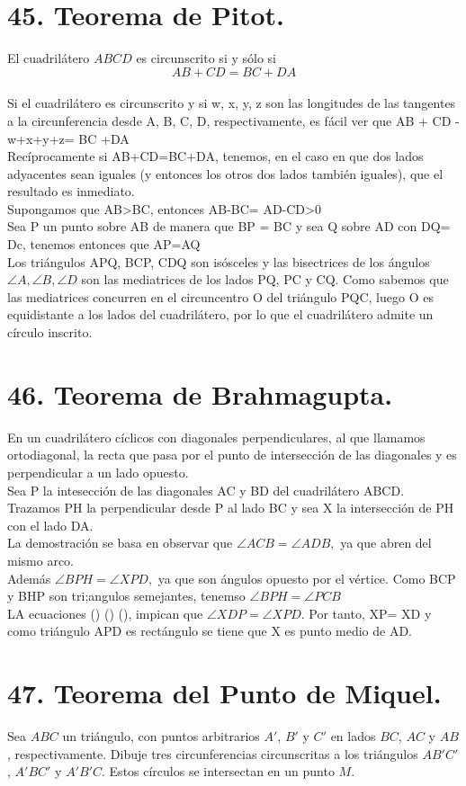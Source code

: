 \documentclass[12pt,a4paper, oneside]{book}
\begin{document}
\section{45. Teorema de Pitot.}
El cuadrilátero $ABCD$ es circunscrito si y sólo si $$AB + CD = BC +DA$$
\\
Si el cuadrilátero es circunscrito y si w, x, y, z son las longitudes de las tangentes a la circunferencia desde A, B, C, D, respectivamente, es fácil ver que AB + CD - w+x+y+z= BC +DA
\\Recíprocamente  si AB+CD=BC+DA, tenemos, en el caso en que dos lados adyacentes sean iguales (y entonces los otros dos lados también iguales), que el resultado es inmediato.
\\Supongamos que AB>BC,  entonces AB-BC= AD-CD>0
\\Sea P un punto sobre AB de manera que BP = BC y sea Q sobre AD con DQ= Dc, tenemos entonces que AP=AQ
\\Los triángulos APQ, BCP, CDQ son isósceles y las bisectrices de los ángulos $\angle A, \angle B, \angle D$ son las mediatrices de los lados PQ, PC y CQ. Como sabemos que las mediatrices concurren en el circuncentro O del triángulo PQC, luego O es equidistante a los lados del cuadrilátero, por lo que el cuadrilátero admite un círculo inscrito.

\section{46. Teorema de Brahmagupta.}
En un cuadrilátero cíclicos con diagonales perpendiculares, al que llamamos ortodiagonal, la recta que pasa por el punto de intersección de las diagonales y es perpendicular a un lado opuesto.
\\
Sea P la intesección de las diagonales AC y BD del cuadrilátero ABCD. Trazamos PH la perpendicular desde P al lado BC y sea X la intersección de PH con el lado DA. \\La demostración se basa en observar que $\angle ACB = \angle ADB,$ ya que abren del mismo arco.
\\Además $\angle BPH =\angle XPD,$ ya que son ángulos opuesto por el vértice. Como BCP y BHP son tri;angulos semejantes, tenemso $\angle BPH = \angle PCB$
\\ LA ecuaciones () () (), impican que $\angle XDP = \angle XPD$. Por tanto, XP= XD y como triángulo APD es rectángulo se tiene que X es punto medio de AD.
\section{47. Teorema del Punto de Miquel.}
Sea $ABC$ un triángulo, con puntos arbitrarios $A'$, $B'$ y $C'$ en lados $BC$, $AC$ y $AB$ , respectivamente. Dibuje tres circunferencias circunscritas a los triángulos $AB'C'$, $A'BC'$ y $A'B'C$. Estos círculos se intersectan en un punto $M$.
\end{document}
